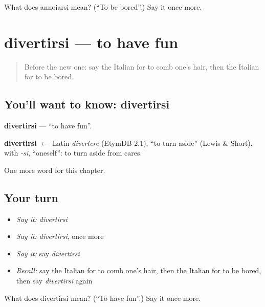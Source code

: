 \begin{tcolorbox}[breakable,colback=teal!4,colframe=teal!35!black,title={Before you move on}]
What does annoiarsi mean? (\textquotedblleft{}To be bored\textquotedblright{}.) Say it once more.
\end{tcolorbox}
\section[divertirsi]{divertirsi — to have fun}

\label{lesson:IT-C236-divertirsi}



\begin{quote}
Before the new one: say the Italian for to comb one's hair, then the Italian for to be bored.
\end{quote}

\subsection*{You'll want to know: divertirsi}
\textbf{divertirsi} — \textquotedblleft{}to have fun\textquotedblright{}.

\begin{cousinweb}
\textbf{divertirsi} $\leftarrow$ Latin \emph{divertere} (EtymDB 2.1), \textquotedblleft{}to turn aside\textquotedblright{} (Lewis \& Short), with \emph{-si}, \textquotedblleft{}oneself\textquotedblright{}: to turn aside from cares.
\end{cousinweb}

\begin{grammarlens}[title={What you've built}]
One more word for this chapter.
\end{grammarlens}

\subsection*{Your turn}
\begin{itemize}
\raggedright
  \item \emph{Say it:} \emph{divertirsi}
  \item \emph{Say it:} \emph{divertirsi}, once more
  \item \emph{Say it:} say \emph{divertirsi}
  \item \emph{Recall:} say the Italian for to comb one's hair, then the Italian for to be bored, then say \emph{divertirsi} again
\end{itemize}

\begin{tcolorbox}[breakable,colback=teal!4,colframe=teal!35!black,title={Before you move on}]
What does divertirsi mean? (\textquotedblleft{}To have fun\textquotedblright{}.) Say it once more.
\end{tcolorbox}
